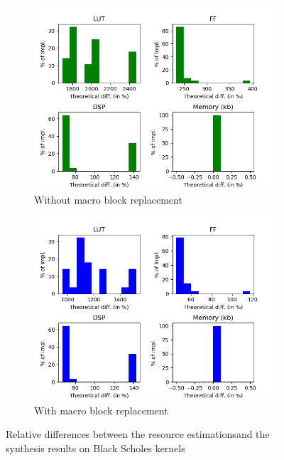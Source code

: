\begin{figure}[h!]
    \centering
    \begin{subfigure}{1.0\textwidth}
        \centering
        \includegraphics[width=.8\textwidth]{Figures/results/bsRelativeWithoutMacro}
        \caption{Without macro block replacement}
        \label{ch.expe:sec.estimators:ssec.resource:fig.bs:sfig.without}
    \end{subfigure}
    \begin{subfigure}{1.0\textwidth}
        \centering
        \includegraphics[width=.8\textwidth]{Figures/results/bsRelativeWithMacro}
        \caption{With macro block replacement}
        \label{ch.expe:sec.estimators:ssec.resource:fig.bs:sfig.with}
    \end{subfigure}
    \caption[Quality of resource estimation on Black Scholes]{Relative differences between the resource estimations\newline and the synthesis results on Black Scholes kernels}
    \label{ch.expe:sec.estimators:ssec.resource:fig.bs}
\end{figure}
\clearpage

